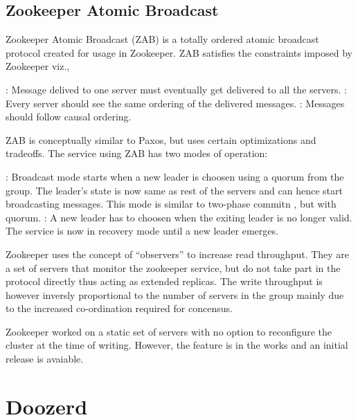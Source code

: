 \subsection{Zookeeper Atomic Broadcast}

Zookeeper Atomic Broadcast (ZAB) 
\citep{Reed:2008:STO:1529974.1529978, JunqueiraRS11} is a 
totally ordered atomic broadcast protocol created for usage in Zookeeper. ZAB
satisfies the constraints imposed by Zookeeper viz.,

\begin{itemize}
    : Message delived to one server must eventually
    get delivered to all the servers.
    : Every server should see the same ordering of the 
    delivered messages.
    : Messages should follow causal%
    ordering.
\end{itemize}

ZAB is conceptually similar to Paxos, but uses certain optimizations and 
tradeoffs. The service using ZAB has two modes of operation:

\begin{itemize}
    : Broadcast mode starts when a new leader is choosen
    using a quorum from the group. The leader's state is now same as rest of
    the servers and can hence start broadcasting messages.
    This mode is similar to two-phase commitn \citep{Gray78}, but with quorum.
    : A new leader has to choosen when the exiting leader 
    is no longer valid. The service is now in recovery mode until a new leader
    emerges.
\end{itemize}

Zookeeper uses the concept of ``observers'' to increase read throughput. They 
are a set of servers that monitor the zookeeper service, but do not take part
in the protocol directly thus acting as extended replicas. The write throughput
is however inversly proportional to the number of servers in the group mainly
due to the increased co-ordination required for concensus.

Zookeeper worked on a static set of servers with no option to reconfigure the
cluster at the time of writing. However, the feature is in the works 
\citep{zab2012}and an initial release is avaiable.

\section{Doozerd}

